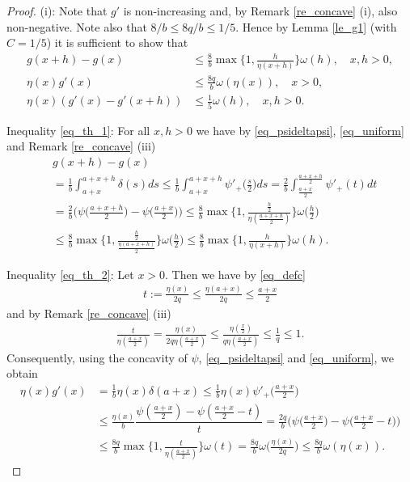 \documentclass[10pt,a4paper]{amsart}
\theoremstyle{definition}
\begin{document}
\begin{proof}
(i): Note that $ g' $ is non-increasing and, by Remark \ref{re_concave} (i), also non-negative. Note also that $ 8/b\leq 8q/b\leq 1/5 $. Hence by Lemma \ref{le_g1} (with $ C=1/5 $) it is sufficient to show that
\begin{align}
g(x+h)-g(x)&\leq\frac{8}{b}\max\bigg\lbrace 1,\frac{h}{\eta(x+h)}\bigg\rbrace\omega(h),\quad x,h>0,\label{eq_th_1}\\
\eta(x)g'(x)&\leq\frac{8q}{b}\omega(\eta(x)),\quad x>0,\label{eq_th_2}\\
\eta(x)(g'(x)-g'(x+h))&\leq\frac{1}{5}\omega(h),\quad x,h>0.\label{eq_th_3}
\end{align}

Inequality \eqref{eq_th_1}: For all $ x,h>0 $ we have by \eqref{eq_psideltapsi}, \eqref{eq_uniform} and Remark \ref{re_concave} (iii)
\begin{align*}
&g(x+h)-g(x)\\
&=\frac{1}{b}\int_{a+x}^{a+x+h}\delta(s)ds\leq\frac{1}{b}\int_{a+x}^{a+x+h}\psi'_+\bigg(\frac{s}{2}\bigg)ds=\frac{2}{b}\int_{\frac{a+x}{2}}^{\frac{a+x+h}{2}}\psi'_+(t)dt\\
&=\frac{2}{b}\bigg(\psi\bigg(\frac{a+x+h}{2}\bigg)-\psi\bigg(\frac{a+x}{2}\bigg)\bigg)\leq\frac{8}{b}\max\bigg\lbrace 1,\frac{\frac{h}{2}}{\eta(\frac{a+x+h}{2})}\bigg\rbrace\omega\bigg(\frac{h}{2}\bigg)\\
&\leq\frac{8}{b}\max\bigg\lbrace 1,\frac{\frac{h}{2}}{\frac{\eta(a+x+h)}{2}}\bigg\rbrace\omega\bigg(\frac{h}{2}\bigg)\leq\frac{8}{b}\max\bigg\lbrace 1,\frac{h}{\eta(x+h)}\bigg\rbrace\omega(h).
\end{align*}

Inequality \eqref{eq_th_2}: Let $ x>0 $. Then we have by \eqref{eq_defc}
\begin{align*}
t:=\frac{\eta(x)}{2q}\leq\frac{\eta(a+x)}{2q}\leq\frac{a+x}{2}
\end{align*}
and by Remark \ref{re_concave} (iii)
\begin{align*}
\frac{t}{\eta(\frac{a+x}{2})}=\frac{\eta(x)}{2q\eta(\frac{a+x}{2})}\leq\frac{\eta(\frac{x}{2})}{q\eta(\frac{a+x}{2})}\leq\frac{1}{q}\leq 1.
\end{align*}
Consequently, using the concavity of $ \psi $, \eqref{eq_psideltapsi} and \eqref{eq_uniform}, we obtain
\begin{align*}
\eta(x)g'(x)&=\frac{1}{b}\eta(x)\delta(a+x)\leq\frac{1}{b}\eta(x)\psi'_+\bigg(\frac{a+x}{2}\bigg)\\
&\leq\frac{\eta(x)}{b}\dfrac{\psi(\frac{a+x}{2})-\psi(\frac{a+x}{2}-t)}{t}=\frac{2q}{b}\bigg(\psi\bigg(\frac{a+x}{2}\bigg)-\psi\bigg(\frac{a+x}{2}-t\bigg)\bigg)\\
&\leq\frac{8q}{b}\max\bigg\lbrace 1,\frac{t}{\eta(\frac{a+x}{2})}\bigg\rbrace\omega(t)=\frac{8q}{b}\omega\bigg(\frac{\eta(x)}{2q}\bigg)\leq\frac{8q}{b}\omega(\eta(x)).
\end{align*}


\end{proof}
\end{document}
